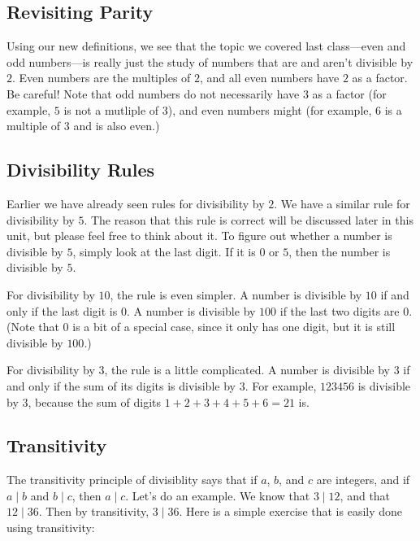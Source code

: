 \documentclass[a4paper,10pt]{report}
\begin{document}
\subsection{Revisiting Parity}

Using our new definitions, we see that the topic we covered last class---even
and odd numbers---is really just the study of numbers that are and aren't
divisible by \(2\). Even numbers are the multiples of \(2\), and all even
numbers have \(2\) as a factor. Be careful! Note that odd numbers do not
necessarily have \(3\) as a factor (for example, \(5\) is not a mutliple of
\(3\)), and even numbers might (for example, \(6\) is a multiple of \(3\) and
is also even.)

\subsection{Divisibility Rules}

Earlier we have already seen rules for divisibility by \(2\). We have a similar
rule for divisibility by \(5\). The reason that this rule is correct will be
discussed later in this unit, but please feel free to think about it. To figure
out whether a number is divisible by \(5\), simply look at the last digit. If
it is \(0\) or \(5\), then the number is divisible by \(5\).

For divisibility by \(10\), the rule is even simpler. A number is divisible by
\(10\) if and only if the last digit is \(0\). A number is divisible by \(100\)
if the last two digits are \(0\). (Note that \(0\) is a bit of a special case,
since it only has one digit, but it is still divisible by \(100\).)

For divisibility by \(3\), the rule is a little complicated. A number is
divisible by \(3\) if and only if the sum of its digits is divisible by \(3\).
For example, \(123456\) is divisible by \(3\), because the sum of digits
\(1+2+3+4+5+6=21\) is.

\subsection{Transitivity}

The \gls{transitivity} principle of divisiblity says that if \(a\), \(b\), and
\(c\) are integers, and if \(a \mid b\) and \(b \mid c\), then \(a \mid c\).
Let's do an example. We know that \(3 \mid 12\), and that \(12 \mid 36\). Then
by transitivity, \(3 \mid 36\). Here is a simple exercise that is easily done
using transitivity:
\end{document}
